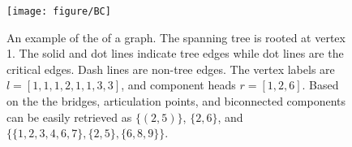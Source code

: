 \begin{figure}
\centering
  \texttt{[image: figure/BC]}
  \vspace{-1em}
  \caption{An example of the \imprep{} of a graph.  The spanning tree is rooted at vertex 1.  The solid and dot lines indicate tree edges while dot lines are the critical edges.  Dash lines are non-tree edges.  The vertex labels are $l=[1,1,1,2,1,1,3,3]$, and component heads $r=[1,2,6]$.
  Based on the \imprep{} the bridges, articulation points, and
  biconnected components can be easily retrieved as $\{(2,5)\}$,
  $\{2,6\}$, and $\{\{1,2,3,4,6,7\},\{2,5\},\{6,8,9\}\}$.
  }\label{fig:eulertour}
\end{figure}
